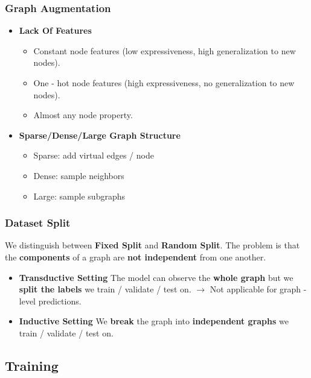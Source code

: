 \documentclass[parskip=full]{scrartcl}
\begin{document}
\subsubsection{Graph Augmentation}
\begin{itemize}
	\item \textbf{Lack Of Features}
		\vspace{-9pt}
		\begin{itemize}[noitemsep]
			\item Constant node features (low expressiveness, high generalization to new nodes).
			\item One - hot node features (high expressiveness, no generalization to new nodes).
			\item Almost any node property.
		\end{itemize}
	\item \textbf{Sparse/Dense/Large Graph Structure}
		\vspace{-9pt}
		\begin{itemize}[noitemsep]
			\item Sparse: add virtual edges / node
			\item Dense: sample neighbors
			\item Large: sample subgraphs
		\end{itemize}
\end{itemize}

\subsubsection{Dataset Split}
We distinguish between \textbf{\gls{Fixed Split}} and \textbf{\gls{Random Split}}.
The problem is that the \textbf{components} of a graph are \textbf{not independent} from one another.
\begin{itemize}
	\item[] \textbf{Transductive Setting} \newline
		The model can observe the \textbf{whole graph} but we \textbf{split the labels} we train / validate / test on. $\rightarrow$ Not applicable for graph - level predictions.
	\item[] \textbf{Inductive Setting} \newline
		We \textbf{break} the graph into \textbf{independent graphs} we train / validate / test on.
\end{itemize}

\subsection{Training}
\end{document}
